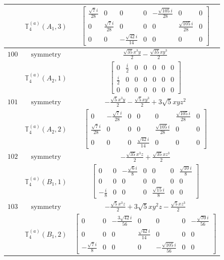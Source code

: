 \documentclass[fleqn,8pt,landscape]{jsarticle}
\begin{document}
\begin{longtable}{ccc}
$  $ & $ \mathbb{T}_{4}^{(a)}(A_{1},3) $ & $ \begin{bmatrix} \frac{\sqrt{7} i}{28} & 0 & 0 & 0 & - \frac{\sqrt{105} i}{28} & 0 & 0 \\ 0 & \frac{\sqrt{7} i}{28} & 0 & 0 & 0 & \frac{\sqrt{105} i}{28} & 0 \\ 0 & 0 & - \frac{\sqrt{42} i}{14} & 0 & 0 & 0 & 0 \end{bmatrix} $ \\ \hline
$ 100 $ & $ \text{symmetry} $ & $ \frac{\sqrt{35} x^{3} y}{2} - \frac{\sqrt{35} x y^{3}}{2} $ \\
$  $ & $ \mathbb{T}_{4}^{(a)}(A_{2},1) $ & $ \begin{bmatrix} 0 & \frac{i}{2} & 0 & 0 & 0 & 0 & 0 \\ \frac{i}{2} & 0 & 0 & 0 & 0 & 0 & 0 \\ 0 & 0 & 0 & 0 & 0 & 0 & 0 \end{bmatrix} $ \\ \hline
$ 101 $ & $ \text{symmetry} $ & $ - \frac{\sqrt{5} x^{3} y}{2} - \frac{\sqrt{5} x y^{3}}{2} + 3 \sqrt{5} x y z^{2} $ \\
$  $ & $ \mathbb{T}_{4}^{(a)}(A_{2},2) $ & $ \begin{bmatrix} 0 & - \frac{\sqrt{7} i}{28} & 0 & 0 & 0 & \frac{\sqrt{105} i}{28} & 0 \\ \frac{\sqrt{7} i}{28} & 0 & 0 & 0 & \frac{\sqrt{105} i}{28} & 0 & 0 \\ 0 & 0 & 0 & \frac{\sqrt{42} i}{14} & 0 & 0 & 0 \end{bmatrix} $ \\ \hline
$ 102 $ & $ \text{symmetry} $ & $ - \frac{\sqrt{35} x^{3} z}{2} + \frac{\sqrt{35} x z^{3}}{2} $ \\
$  $ & $ \mathbb{T}_{4}^{(a)}(B_{1},1) $ & $ \begin{bmatrix} 0 & 0 & - \frac{\sqrt{6} i}{8} & 0 & 0 & 0 & \frac{\sqrt{10} i}{8} \\ 0 & 0 & 0 & 0 & 0 & 0 & 0 \\ - \frac{i}{8} & 0 & 0 & 0 & \frac{\sqrt{15} i}{8} & 0 & 0 \end{bmatrix} $ \\ \hline
$ 103 $ & $ \text{symmetry} $ & $ - \frac{\sqrt{5} x^{3} z}{2} + 3 \sqrt{5} x y^{2} z - \frac{\sqrt{5} x z^{3}}{2} $ \\
$  $ & $ \mathbb{T}_{4}^{(a)}(B_{1},2) $ & $ \begin{bmatrix} 0 & 0 & - \frac{3 \sqrt{42} i}{56} & 0 & 0 & 0 & - \frac{\sqrt{70} i}{56} \\ 0 & 0 & 0 & \frac{\sqrt{42} i}{14} & 0 & 0 & 0 \\ - \frac{\sqrt{7} i}{8} & 0 & 0 & 0 & - \frac{\sqrt{105} i}{56} & 0 & 0 \end{bmatrix} $ \\ \hline

\end{longtable}
\end{document}
